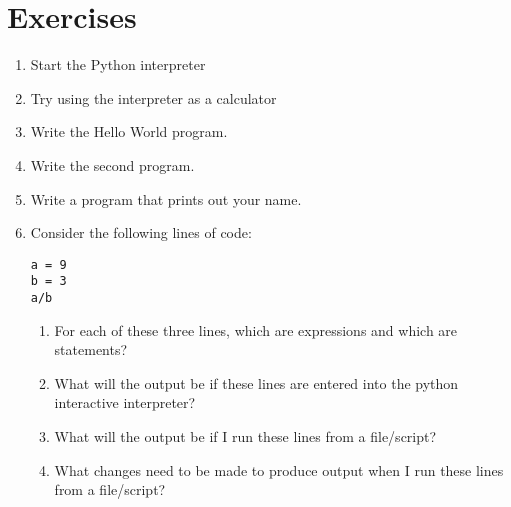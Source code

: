 \section{Exercises}
\begin{enumerate}
    \item Start the Python interpreter 
    \item Try using the interpreter as a calculator 
    \item Write the Hello World program. 
    \item Write the second program. 
    \item Write a program that prints out your name. 
    \item Consider the following lines of code:
\begin{lstlisting}
a = 9
b = 3
a/b\end{lstlisting}
        \begin{enumerate}
            \item For each of these three lines, which are expressions and     which are statements?
            \item What will the output be if these lines are entered into the     python interactive interpreter?
            \item What will the output be if I run these lines from a     file/script?
            \item What changes need to be made to produce output when I run     these lines from a file/script?
        \end{enumerate}
\end{enumerate}
